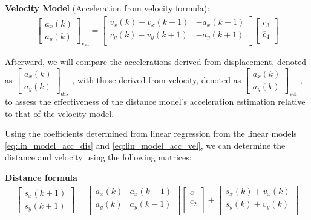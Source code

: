 \textbf{Velocity Model} (Acceleration from velocity formula):
\begin{align} \label{eq:lin_model_acc_vel}
    \begin{bmatrix}
        a_x(k) \\ 
        a_y(k) 
    \end{bmatrix}_{\text{vel}}
    =
    \begin{bmatrix}
        v_x(k) - v_x(k+1) & -a_x(k+1)    \\ 
        v_y(k) - v_y(k+1) & -a_y(k+1)    \\
    \end{bmatrix}
    \begin{bmatrix}
        \overline{c}_3 \\
        \overline{c}_4 \\
   \end{bmatrix}
\end{align}

\hfil

Afterward, we will compare the accelerations derived from displacement, denoted as 
$\begin{bmatrix} a_x(k) \\ a_y(k) \end{bmatrix}_{dis}$
, with those derived from velocity, denoted as 
$\begin{bmatrix} a_x(k) \\ a_y(k) \end{bmatrix}_{\text{vel}}$
, to assess the effectiveness of the distance model's acceleration estimation relative to that of the velocity model.


Using the coefficients determined from linear regression from the linear models \eqref{eq:lin_model_acc_dis} 
and \eqref{eq:lin_model_acc_vel}, we can determine the distance and velocity using the following 
matrices:

\hfil

\textbf{Distance formula}
{\footnotesize
\begin{align}
\label{eq:distance_matrix}
    \begin{bmatrix} s_x(k+1) \\ s_y(k+1) \end{bmatrix}
    =
    \begin{bmatrix} a_x(k) & a_x(k-1)    \\ a_y(k) & a_y(k-1)    \\ \end{bmatrix}
    \begin{bmatrix} c_1 \\ c_2 \\ \end{bmatrix}
    +
    \begin{bmatrix} s_x(k) + v_x(k) \\ s_y(k) + v_y(k) \\ \end{bmatrix}
\end{align} 
}

